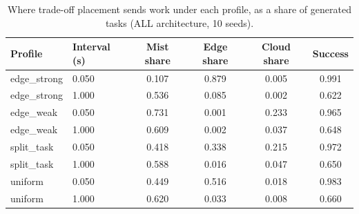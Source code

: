 \begin{table}
\centering
\footnotesize
\caption{Where trade-off placement sends work under each profile, as a share of generated tasks (ALL architecture, 10 seeds).}
\label{tab:p1-hetero-affinity}
\begin{tabular}{llcccc}
\toprule
Profile & Interval (s) & Mist share & Edge share & Cloud share & Success \\
\midrule
edge\_strong & 0.050 & 0.107 & 0.879 & 0.005 & 0.991 \\
edge\_strong & 1.000 & 0.536 & 0.085 & 0.002 & 0.622 \\
edge\_weak & 0.050 & 0.731 & 0.001 & 0.233 & 0.965 \\
edge\_weak & 1.000 & 0.609 & 0.002 & 0.037 & 0.648 \\
split\_task & 0.050 & 0.418 & 0.338 & 0.215 & 0.972 \\
split\_task & 1.000 & 0.588 & 0.016 & 0.047 & 0.650 \\
uniform & 0.050 & 0.449 & 0.516 & 0.018 & 0.983 \\
uniform & 1.000 & 0.620 & 0.033 & 0.008 & 0.660 \\
\bottomrule
\end{tabular}
\par\vspace{2pt}{\footnotesize\raggedright The cloud share is what an adaptive orchestrator can exploit; under the weak-edge profile it is both reachable and fast, which is why the effect is positive there at 50 ms.\par}
\end{table}
